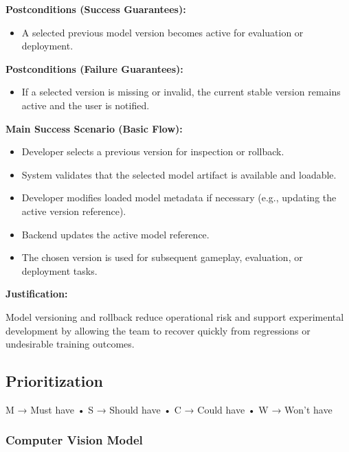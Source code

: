 \documentclass{article}
\begin{document}
\noindent\textbf{Postconditions (Success Guarantees):}
\begin{itemize}
    \item A selected previous model version becomes active for evaluation or deployment.
\end{itemize}

\noindent\textbf{Postconditions (Failure Guarantees):}
\begin{itemize}
    \item If a selected version is missing or invalid, the current stable version remains active and the user is notified.
\end{itemize}

\noindent\textbf{Main Success Scenario (Basic Flow):}
\begin{itemize}
    \item Developer selects a previous version for inspection or rollback.
    \item System validates that the selected model artifact is available and loadable.
    \item Developer modifies loaded model metadata if necessary (e.g., updating the active version reference).
    \item Backend updates the active model reference.
    \item The chosen version is used for subsequent gameplay, evaluation, or deployment tasks.
\end{itemize}

\noindent\textbf{Justification:}

Model versioning and rollback reduce operational risk and support experimental development by allowing the team to recover quickly from regressions or undesirable training outcomes.

\vspace{1em}

\subsection{Prioritization}\label{subsec:prioritization}
M → Must have
• S → Should have
• C → Could have
• W → Won't have 

\vspace{1em}

\subsubsection*{Computer Vision Model}
\end{document}
